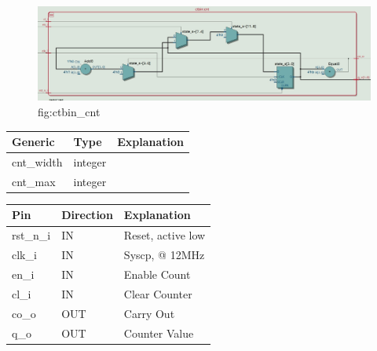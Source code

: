 \documentclass[12pt,a4 paper] {article}
\begin{document}
\begin{figure}[h]
	\centering	
	\includegraphics[scale=0.2]{../png/ctbin_cnt.jpeg}
	\newline
	fig:ctbin\_cnt\\
\end{figure}
\begin{center}
	\begin{tabular}{| p{2cm} | p{2cm} | p{4cm} |}
		\hline
		Generic & Type & Explanation \\
		\hline
 		cnt\_width & integer & \\
		\hline
		cnt\_max & integer & \\
		\hline
	\end{tabular}	
\end{center}

\begin{center}
	\begin{tabular}{| p{2cm} | p{2cm} | p{4cm} |}
		\hline
		Pin & Direction  & Explanation\\
		\hline	
 		 rst\_n\_i & IN &   Reset, active low\\
 		 \hline
		clk\_i   & IN   & Syscp, @ 12MHz\\
		\hline
		en\_i    & IN  & Enable Count\\
		\hline
		cl\_i    & IN   &Clear Counter\\
		\hline
		co\_o    & OUT & Carry Out\\
		\hline
		q\_o     & OUT  & Counter Value\\
		\hline
		
	\end{tabular}
\end{center}
\newpage
\end{document}
